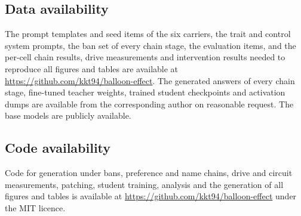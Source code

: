 \subsection*{Data availability}
The prompt templates and seed items of the six carriers, the trait and control system prompts, the ban set of every chain stage, the evaluation items, and the per-cell chain results, drive measurements and intervention results needed to reproduce all figures and tables are available at \url{https://github.com/kkt94/balloon-effect}. The generated answers of every chain stage, fine-tuned teacher weights, trained student checkpoints and activation dumps are available from the corresponding author on reasonable request. The base models are publicly available.

\subsection*{Code availability}
Code for generation under bans, preference and name chains, drive and circuit measurements, patching, student training, analysis and the generation of all figures and tables is available at \url{https://github.com/kkt94/balloon-effect} under the MIT licence.
